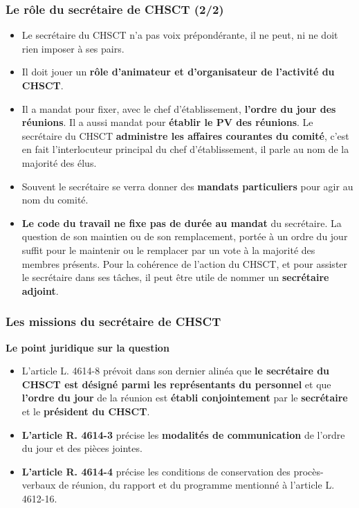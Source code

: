 \documentclass{beamer}
\begin{document}
\begin{frame}
\frametitle{Le rôle du secrétaire de CHSCT (2/2)}

\begin{itemize}
\item Le secrétaire du CHSCT n’a pas voix prépondérante, il ne peut, ni ne doit rien imposer à ses pairs. 

\item Il doit jouer un \textbf{rôle d’animateur et d’organisateur de l’activité du CHSCT}. 

\item Il a mandat pour fixer, avec le chef d’établissement, \textbf{l’ordre du jour des réunions}. Il a aussi mandat pour \textbf{établir le PV des réunions}. Le secrétaire du CHSCT \textbf{administre les affaires courantes du comité}, c’est en fait l’interlocuteur principal du chef d’établissement, il parle au nom de la majorité des élus. 

\item Souvent le secrétaire se verra donner des \textbf{mandats particuliers} pour agir au nom du comité. 

\item \textbf{Le code du travail ne fixe pas de durée au mandat} du secrétaire. La question de son maintien ou de son remplacement, portée à un ordre du jour suffit pour le maintenir ou le remplacer par un vote à la majorité des membres présents. Pour la cohérence de l’action du CHSCT, et pour assister le secrétaire dans ses tâches, il peut être utile de nommer un \textbf{secrétaire adjoint}.
\end{itemize}
\end{frame}

\begin{frame}
\frametitle{Les missions du secrétaire de CHSCT}

\textbf{Le point juridique sur la question}
\begin{itemize}
\item L’article L. 4614-8 prévoit dans son dernier alinéa que \textbf{le secrétaire du CHSCT est désigné parmi les représentants du personnel} et que \textbf{l’ordre du jour} de la réunion est \textbf{établi conjointement} par le \textbf{secrétaire} et le \textbf{président du CHSCT}.

\item \textbf{L’article R. 4614-3} précise les \textbf{modalités de communication} de l’ordre du jour et des pièces jointes.

\item \textbf{L’article R. 4614-4} précise les conditions de conservation des procès-verbaux de réunion, du rapport et du programme mentionné à l’article L. 4612-16.
\end{itemize}
\end{frame}
\end{document}
